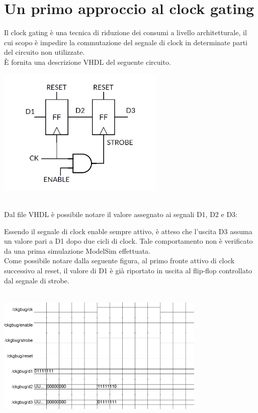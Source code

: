 \documentclass[11pt,  english, makeidx, a4paper, titlepage, oneside]{book}
\newenvironment{listato}{\footnotesize} {\normalsize }
\begin{document}
\section{Un primo approccio al clock gating}
Il clock gating è una tecnica di riduzione dei consumi a livello architetturale, il cui scopo è impedire la commutazione del segnale di clock in determinate parti del circuito non utilizzate.
\\
È fornita una descrizione VHDL del seguente circuito.
\\
\centerline{\includegraphics[width=8cm]{./img/Lab_3/circuito_clk_bug.png}}
\\
Dal file VHDL è possibile notare il valore assegnato ai segnali D1, D2 e D3:
\begin{center}
\begin{listato}
	\centerline{}
\end{listato}
\end{center}
Essendo il segnale di clock enable sempre attivo, è atteso che l'uscita D3 assuma un valore pari a D1 dopo due cicli di clock. Tale comportamento non è verificato da una prima simulazione ModelSim effettuata.
\\
Come possibile notare dalla seguente figura, al primo fronte attivo di clock successivo al reset, il valore di D1 è già riportato in uscita al flip-flop controllato dal segnale di strobe.
\\\\
\centerline{\includegraphics[width=10cm]{./img/Lab_3/clk_bug.png}}
\end{document}
